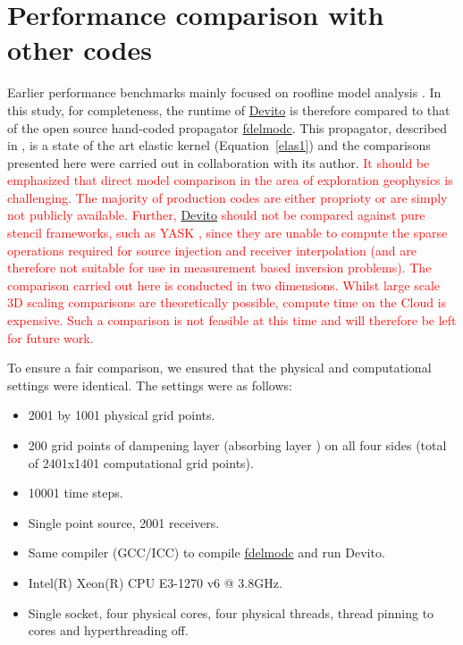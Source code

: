 \documentclass[10pt, conference]{IEEEtran}
\newcommand{\devito}{\href{https://github.com/devitocodes/devito}{Devito} }
\begin{document}
\section{Performance comparison with other
codes}\label{performance-comparison-with-other-codes}

Earlier performance benchmarks mainly focused on roofline model analysis
\textcolor{red}{\cite{sevendwarfs, patterson, williams2009roofline, louboutin2016ppf}}.
In this study, for completeness, the runtime of \devito is therefore
compared to that of the open source hand-coded propagator
\href{https://github.com/JanThorbecke/OpenSource.git}{fdelmodc}. This propagator,
described in \cite{thorbecke}, is a state of the art elastic kernel
(Equation~\ref{elas1}) and the comparisons presented here were carried out
in collaboration with its author.
\textcolor{red}{It should be emphasized that direct model comparison in
the area of exploration geophysics is challenging. The majority of production
codes are either proprioty or are simply not publicly available. Further,
\devito should not be compared against pure stencil frameworks,
such as YASK \cite{yask}, since they are unable to compute the sparse operations
required for source injection and receiver interpolation (and are therefore not
suitable for use in measurement based inversion problems). The comparison carried out
here is conducted in two dimensions. Whilst large scale 3D scaling comparisons are theoretically
possible, compute time on the Cloud is expensive. Such a comparison is not feasible at this
time and will therefore be left for future work.}

To ensure a fair comparison, we ensured that the
physical and computational settings were identical. The settings were as
follows:

\begin{itemize}
\itemsep1pt\parskip0pt
\item
  2001 by 1001 physical grid points.
\item
  200 grid points of dampening layer (absorbing layer \cite{cerjan}) on
  all four sides (total of 2401x1401 computational grid points).
\item
  10001 time steps.
\item
  Single point source, 2001 receivers.
\item
  Same compiler (GCC/ICC) to compile
  \href{https://github.com/JanThorbecke/OpenSource.git}{fdelmodc} and
  run Devito.
\item
  Intel(R) Xeon(R) CPU E3-1270 v6 @ 3.8GHz.
\item
  Single socket, four physical cores, four physical threads, thread
  pinning to cores and hyperthreading off.
\end{itemize}
\end{document}
